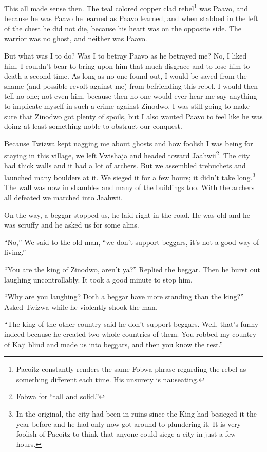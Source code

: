 This all made sense then. The teal colored copper clad rebel\footnote{Pa\-co\-itz constantly renders the same Fo\-bwa phrase regarding the rebel as something different each time. His unsurety is nauseating.} was Paa\-vo, and because he was Paa\-vo he learned as Paa\-vo learned, and when stabbed in the left of the chest he did not die, because his heart was on the opposite side. The warrior was no ghost, and neither was Paa\-vo.

But what was I to do? Was I to betray Paa\-vo as he betrayed me?
No, I liked him.
I couldn't bear to bring upon him that much disgrace and to lose him to death a second time.
As long as no one found out, I would be saved from the shame (and possible revolt against me) from befriending this rebel. I would then tell no one; not even him, because then no one would ever hear me say anything to implicate myself in such a crime against Zi\-no\-dwo. I was still going to make sure that Zi\-no\-dwo got plenty of spoils, but I also wanted Paa\-vo to feel like he was doing at least something noble to obstruct our conquest.

\tbreak

Because Twi\-zwa kept nagging me about ghosts and how foolish I was being for staying in this village, we left Vwishaja and headed toward Jaa\-hwii\footnote{Fo\-bwa for ``tall and solid.''}. The city had thick walls and it had a lot of archers. But we assembled trebuchets and launched many boulders at it. We sieged it for a few hours; it didn't take long.\footnote{In the original, the city had been in ruins since the King had besieged it the year before and he had only now got around to plundering it. It is very foolish of Pa\-co\-itz to think that anyone could siege a city in just a few hours.} The wall was now in shambles and many of the buildings too. With the archers all defeated we marched into Jaa\-hwii.

On the way, a beggar stopped us, he laid right in the road. He was old and he was scruffy and he asked us for some alms.

``No,'' We said to the old man, ``we don't support beggars, it's not a good way of living.''

``You are the king of Zi\-no\-dwo, aren't ya?'' Replied the beggar. Then he burst out laughing uncontrollably. It took a good minute to stop him.

``Why are you laughing? Doth a beggar have more standing than the king?'' Asked Twi\-zwa while he violently shook the man.

``The king of the other country said he don't support beggars. Well, that's funny indeed because he created two whole countries of them. You robbed my country of Ka\-ji blind and made us into beggars, and then you know the rest.''

